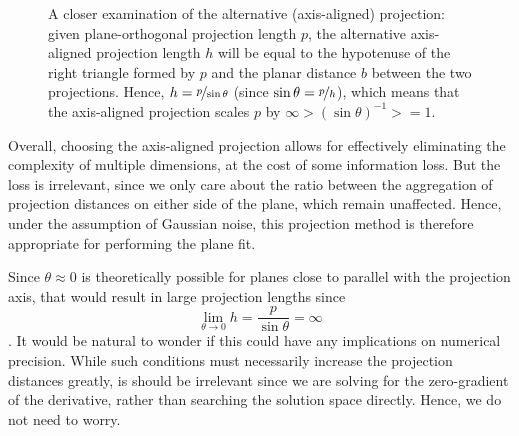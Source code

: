 \begin{figure}[!h]
\begin{center}
		\caption{A closer examination of the alternative (axis-aligned) projection: given plane-orthogonal projection length $p$, the alternative axis-aligned projection length $h$ will be equal to the hypotenuse of the right triangle formed by $p$ and the planar distance $b$ between the two projections. Hence,  $ h= \nicefrac{p}{\sin\theta} $ (since $\sin \theta = \i{p}/h$), which means that the axis-aligned projection scales  $p$ by $\infty > (\sin\theta)^{-1} >= 1$. }
		\label{fig:axisProjectionIsTriangle}
	\end{center}
\end{figure}

Overall, choosing the axis-aligned projection allows for effectively eliminating the complexity of multiple dimensions, at the cost of some information loss. But the loss is irrelevant, since we only care about the ratio between the aggregation of projection distances on either side of the plane, which remain unaffected. Hence, under the assumption of Gaussian noise, this projection method is therefore appropriate for performing the plane fit.


Since $\theta \approx 0 $ is theoretically possible  for planes close to parallel with the projection axis, that would result in large projection lengths since
$$
\lim_{\theta \to 0 } h  = \frac{p}{\sin \theta} = \infty
$$
. It would be natural to wonder if this could have any implications on numerical precision. While such conditions must necessarily increase the projection distances greatly, is should be irrelevant since we are solving for the zero-gradient of the derivative, rather than searching the solution space directly. Hence, we do not need to worry.   






